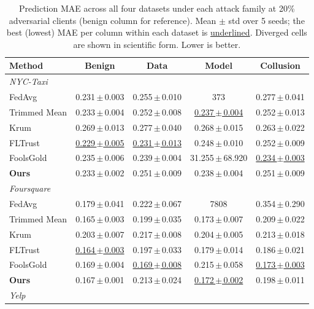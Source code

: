 \begin{table}[t]
\centering
\small
\setlength{\tabcolsep}{5pt}
\caption{Prediction MAE across all four datasets under each attack family at 20\% adversarial clients (benign column for reference). Mean $\pm$ std over 5 seeds; the best (lowest) MAE per column within each dataset is \underline{underlined}. Diverged cells are shown in scientific form. Lower is better.}
\label{tab:combined}
\begin{tabular}{lcccc}
\toprule
\textbf{Method} & \textbf{Benign} & \textbf{Data} & \textbf{Model} & \textbf{Collusion} \\
\midrule
\multicolumn{5}{l}{\textit{NYC-Taxi}} \\
FedAvg & 0.231\,$\pm$\,0.003 & 0.255\,$\pm$\,0.010 & 373 & 0.277\,$\pm$\,0.041 \\
Trimmed Mean & 0.233\,$\pm$\,0.004 & 0.252\,$\pm$\,0.008 & \underline{0.237\,$\pm$\,0.004} & 0.252\,$\pm$\,0.013 \\
Krum & 0.269\,$\pm$\,0.013 & 0.277\,$\pm$\,0.040 & 0.268\,$\pm$\,0.015 & 0.263\,$\pm$\,0.022 \\
FLTrust & \underline{0.229\,$\pm$\,0.005} & \underline{0.231\,$\pm$\,0.013} & 0.248\,$\pm$\,0.010 & 0.252\,$\pm$\,0.009 \\
FoolsGold & 0.235\,$\pm$\,0.006 & 0.239\,$\pm$\,0.004 & 31.255\,$\pm$\,68.920 & \underline{0.234\,$\pm$\,0.003} \\
\textbf{Ours} & 0.233\,$\pm$\,0.002 & 0.251\,$\pm$\,0.009 & 0.238\,$\pm$\,0.004 & 0.251\,$\pm$\,0.009 \\
\midrule
\multicolumn{5}{l}{\textit{Foursquare}} \\
FedAvg & 0.179\,$\pm$\,0.041 & 0.222\,$\pm$\,0.067 & 7808 & 0.354\,$\pm$\,0.290 \\
Trimmed Mean & 0.165\,$\pm$\,0.003 & 0.199\,$\pm$\,0.035 & 0.173\,$\pm$\,0.007 & 0.209\,$\pm$\,0.022 \\
Krum & 0.203\,$\pm$\,0.007 & 0.217\,$\pm$\,0.008 & 0.204\,$\pm$\,0.005 & 0.213\,$\pm$\,0.018 \\
FLTrust & \underline{0.164\,$\pm$\,0.003} & 0.197\,$\pm$\,0.033 & 0.179\,$\pm$\,0.014 & 0.186\,$\pm$\,0.021 \\
FoolsGold & 0.169\,$\pm$\,0.004 & \underline{0.169\,$\pm$\,0.008} & 0.215\,$\pm$\,0.058 & \underline{0.173\,$\pm$\,0.003} \\
\textbf{Ours} & 0.167\,$\pm$\,0.001 & 0.213\,$\pm$\,0.024 & \underline{0.172\,$\pm$\,0.002} & 0.198\,$\pm$\,0.011 \\
\midrule
\multicolumn{5}{l}{\textit{Yelp}} \\

\end{tabular}
\end{table}
